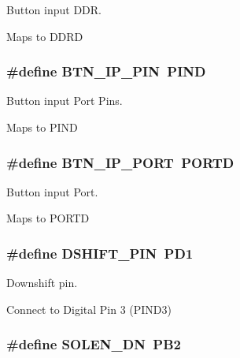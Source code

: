 Button input D\-D\-R. 

Maps to D\-D\-R\-D \hypertarget{group__port_defs_ga220b3ddb5e9bac9ed273e011f267a536}{
\subsubsection[{B\-T\-N\-\_\-\-I\-P\-\_\-\-P\-I\-N}]{\setlength{\rightskip}{0pt plus 5cm}\#define {\bf B\-T\-N\-\_\-\-I\-P\-\_\-\-P\-I\-N}~P\-I\-N\-D}}\label{group__port_defs_ga220b3ddb5e9bac9ed273e011f267a536}


Button input Port Pins. 

Maps to P\-I\-N\-D \hypertarget{group__port_defs_ga6ac943017d31877e3b86387e14c9b006}{
\subsubsection[{B\-T\-N\-\_\-\-I\-P\-\_\-\-P\-O\-R\-T}]{\setlength{\rightskip}{0pt plus 5cm}\#define {\bf B\-T\-N\-\_\-\-I\-P\-\_\-\-P\-O\-R\-T}~P\-O\-R\-T\-D}}\label{group__port_defs_ga6ac943017d31877e3b86387e14c9b006}


Button input Port. 

Maps to P\-O\-R\-T\-D \hypertarget{group__port_defs_ga7f2aeb6091a43ad2b243e35a521ec5b0}{
\subsubsection[{D\-S\-H\-I\-F\-T\-\_\-\-P\-I\-N}]{\setlength{\rightskip}{0pt plus 5cm}\#define {\bf D\-S\-H\-I\-F\-T\-\_\-\-P\-I\-N}~P\-D1}}\label{group__port_defs_ga7f2aeb6091a43ad2b243e35a521ec5b0}


Downshift pin. 


\begin{DoxyItemize}
\item Connect to Digital Pin 3 (P\-I\-N\-D3) 
\end{DoxyItemize}\hypertarget{group__port_defs_gae38dab54770629f5f2b7975164123353}{
\subsubsection[{S\-O\-L\-E\-N\-\_\-\-D\-N}]{\setlength{\rightskip}{0pt plus 5cm}\#define {\bf S\-O\-L\-E\-N\-\_\-\-D\-N}~P\-B2}}\label{group__port_defs_gae38dab54770629f5f2b7975164123353}


